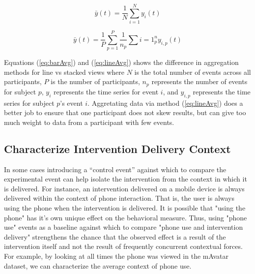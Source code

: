 \begin{equation}
	\bar{y}(t) = \frac{1}{N} \sum\limits_{i=1}^N y_i(t)
	\label{eq:barAvg}
\end{equation}

\begin{equation}
	\bar{y}(t) = \frac{1}{P} \sum\limits_{p=1}^P \frac{1}{n_p} \sum\limits{i=1}^n_p y_{i,p}(t)
	\label{eq:lineAvg}
\end{equation}
	
Equations (\ref{eq:barAvg}) and (\ref{eq:lineAvg}) shows the difference in aggregation methods for line vs stacked views where $N$ is the total number of events across all participants, $P$ is the number of participants, $n_p$ represents the number of events for subject $p$,  $y_i$ represents the time series for event $i$, and $y_{i,p}$ represents the time series for subject $p$'s event $i$.
Aggretating data via method (\ref{eq:lineAvg}) does a better job to ensure that one participant does not skew results, but can give too much weight to data from a participant with few events.

\subsection{Characterize Intervention Delivery Context}
In some cases introducing a “control event” against which to compare the experimental event can help isolate the intervention from the context in which it is delivered.
For instance, an intervention delivered on a mobile device is always delivered within the context of phone interaction.
That is, the user is always using the phone when the intervention is delivered.
It is possible that "using the phone" has it's own unique effect on the behavioral measure.
Thus, using "phone use" events as a baseline against which to compare "phone use and intervention delivery" strengthens the chance that the observed effect is a result of the intervention itself and not the result of frequently concurrent contextual forces. 
For example, by looking at all times the phone was viewed in the mAvatar dataset, we can characterize the average context of phone use.

